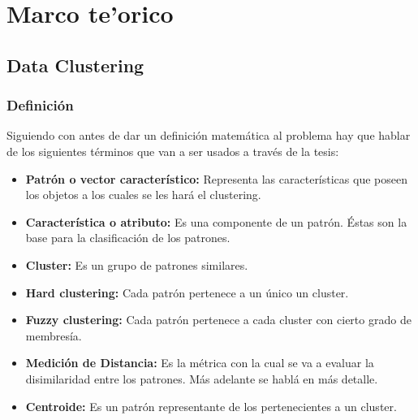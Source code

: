 \chapter{Marco te'orico} \label{chap:dclust}

\vspace{5 mm}

\section{Data Clustering} \label{sect:dclust}

\subsection{Definici\'on} \label{sect:dclustdef} \label{sect:dclustd}

Siguiendo con \cite{SwAjAm2009} antes de dar un definici\'on matem\'atica al problema hay que hablar de 
los siguientes t\'erminos que van a ser usados a trav\'es de la tesis:

\begin{itemize}

\item {\bf Patr\'on o vector caracter\'istico:} Representa las
caracter\'isticas que poseen los objetos a los cuales se les har\'a el clustering.

\item {\bf Caracter\'istica o atributo:} Es una componente de un patr\'on. \'Estas son
la base para la clasificaci\'on de los patrones.

\item {\bf Cluster:} Es un grupo de patrones similares.

\item {\bf Hard clustering:} Cada patr\'on pertenece a un \'unico un cluster.

\item {\bf Fuzzy clustering:} Cada patr\'on pertenece a cada cluster con cierto grado de membres\'ia.

\item {\bf Medici\'on de Distancia:} Es la m\'etrica con la cual se va a evaluar
la disimilaridad entre los patrones. M\'as adelante se habl\'a en m\'as detalle.

\item {\bf Centroide:} Es un patrón representante de los pertenecientes
a un cluster.

\end{itemize}


